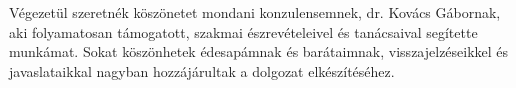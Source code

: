 \chapter*{\koszonetnyilvanitas}

Végezetül szeretnék köszönetet mondani konzulensemnek, dr. Kovács Gábornak, aki folyamatosan támogatott, szakmai észrevételeivel és tanácsaival segítette munkámat. Sokat köszönhetek édesapámnak és barátaimnak, visszajelzéseikkel és javaslataikkal nagyban hozzájárultak a dolgozat elkészítéséhez.
